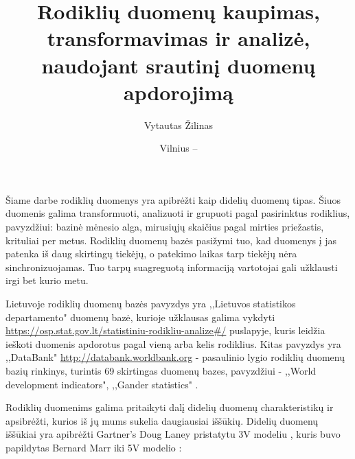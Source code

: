 \documentclass{VUMIFPSkursinis}
\title{Rodiklių duomenų kaupimas, transformavimas ir analizė, naudojant srautinį duomenų apdorojimą}
\author{Vytautas Žilinas}
\date{Vilnius – \the\year}
\begin{document}
	
\maketitle
\cleardoublepage{}
\setcounter{page}{2}

\tableofcontents


    Šiame darbe rodiklių duomenys yra apibrėžti kaip didelių duomenų tipas. Šiuos duomenis galima transformuoti, analizuoti ir grupuoti pagal pasirinktus rodiklius, 
pavyzdžiui: bazinė mėnesio alga, mirusiųjų skaičius pagal mirties priežastis, krituliai per metus. 
Rodiklių duomenų bazės pasižymi tuo, kad duomenys į jas patenka iš daug skirtingų tiekėjų, o patekimo laikas tarp
tiekėjų nėra sinchronizuojamas. Tuo tarpų suagreguotą informaciją vartotojai gali užklausti irgi bet kurio metu. \par
Lietuvoje rodiklių duomenų bazės pavyzdys yra ,,Lietuvos statistikos departamento" duomenų bazė, kurioje užklausas galima vykdyti
\url{https://osp.stat.gov.lt/statistiniu-rodikliu-analize#/} puslapyje, kuris leidžia ieškoti duomenis apdorotus pagal vieną arba kelis rodiklius. 
Kitas pavyzdys yra ,,DataBank" \url{http://databank.worldbank.org} - pasaulinio lygio rodiklių duomenų bazių rinkinys, turintis 69 skirtingas 
duomenų bazes, pavyzdžiui - ,,World development indicators", ,,Gander statistics" \cite{databank-stats}. \par
Rodiklių duomenims galima pritaikyti dalį didelių duomenų charakteristikų ir apsibrėžti, kurios iš jų mums sukelia daugiausiai iššūkių.
Didelių duomenų iššūkiai yra apibrėžti Gartner's Doug Laney pristatytu 3V modeliu \cite{laney20013d},
kuris buvo papildytas Bernard Marr iki 5V modelio \cite{marr2014big}:
\end{document}
